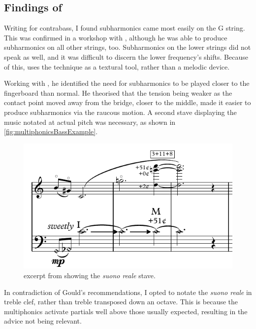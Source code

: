 \subsection{Findings of \bassPiece}
Writing for contrabass, I found subharmonics came most easily on the G string. 
This was confirmed in a workshop with \bassParticipant, although he was able to produce subharmonics on all other strings, too.
Subharmonics on the lower strings did not speak as well, and it was difficult to discern the lower frequency's shifts.
Because of this, \bassPiece\space uses the technique as a textural tool, rather than a melodic device.

Working with \bassParticipant, he identified the need for subharmonics to be played closer to the fingerboard than normal.
He theorised that the tension being weaker as the contact point moved away from the bridge, closer to the middle, made it easier to produce subharmonics via the raucous motion.\autocite[]{bloggsFeedbackContrabassSession2019}
A second stave displaying the music notated at actual pitch was necessary, as shown in \autoref{fig:multiphonicsBassExample}.
\begin{figure}
  \centering
  \includegraphics{./resources/multiphonicsBassExample.pdf}
  \caption{excerpt from \bassPiece\space showing the \emph{suono reale} stave.}\label{fig:multiphonicsBassExample}
\end{figure}
In contradiction of Gould's recommendations, I opted to notate the \emph{suono reale} in treble clef, rather than treble transposed down an octave.\autocite[423]{gouldBars2011}
This is because the multiphonics activate partials well above those usually expected, resulting in the advice not being relevant.
